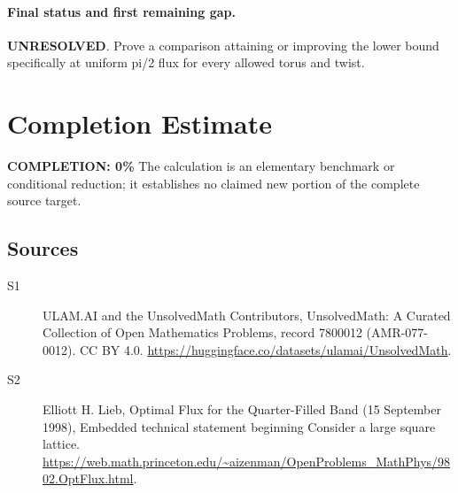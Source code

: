 \documentclass[11pt]{article}
\begin{document}
\paragraph{Final status and first remaining gap.}
\textbf{UNRESOLVED}. Prove a comparison attaining or improving the lower bound specifically at uniform pi/2 flux for every allowed torus and twist.

\section{Completion Estimate}
\noindent\textbf{COMPLETION: 0\%}
The calculation is an elementary benchmark or conditional reduction; it establishes no claimed new portion of the complete source target.

\subsection{Sources}
\begin{description}
\item[\hypertarget{source:7800012:1}{S1}] ULAM.AI and the UnsolvedMath Contributors, UnsolvedMath: A Curated Collection of Open Mathematics Problems, record 7800012 (AMR-077-0012). CC BY 4.0. \url{https://huggingface.co/datasets/ulamai/UnsolvedMath}.
\item[\hypertarget{source:7800012:2}{S2}] Elliott H. Lieb, Optimal Flux for the Quarter-Filled Band (15 September 1998), Embedded technical statement beginning Consider a large square lattice. \url{https://web.math.princeton.edu/~aizenman/OpenProblems_MathPhys/9802.OptFlux.html}.
\end{description}
\label{end:7800012}
\end{document}
